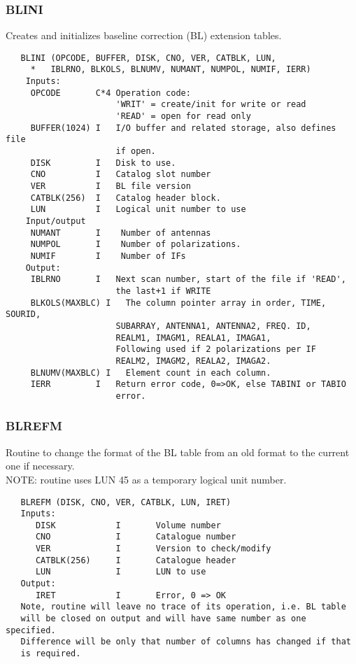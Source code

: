 \subsubsection{BLINI}
Creates and initializes baseline correction (BL) extension tables.
\begin{verbatim}
   BLINI (OPCODE, BUFFER, DISK, CNO, VER, CATBLK, LUN,
     *   IBLRNO, BLKOLS, BLNUMV, NUMANT, NUMPOL, NUMIF, IERR)
    Inputs:
     OPCODE       C*4 Operation code:
                      'WRIT' = create/init for write or read
                      'READ' = open for read only
     BUFFER(1024) I   I/O buffer and related storage, also defines file
                      if open.
     DISK         I   Disk to use.
     CNO          I   Catalog slot number
     VER          I   BL file version
     CATBLK(256)  I   Catalog header block.
     LUN          I   Logical unit number to use
    Input/output
     NUMANT       I    Number of antennas
     NUMPOL       I    Number of polarizations.
     NUMIF        I    Number of IFs
    Output:
     IBLRNO       I   Next scan number, start of the file if 'READ',
                      the last+1 if WRITE
     BLKOLS(MAXBLC) I   The column pointer array in order, TIME, SOURID,
                      SUBARRAY, ANTENNA1, ANTENNA2, FREQ. ID,
                      REALM1, IMAGM1, REALA1, IMAGA1,
                      Following used if 2 polarizations per IF
                      REALM2, IMAGM2, REALA2, IMAGA2.
     BLNUMV(MAXBLC) I   Element count in each column.
     IERR         I   Return error code, 0=>OK, else TABINI or TABIO
                      error.
\end{verbatim}

\subsubsection{BLREFM}
Routine to change the format of the BL table from an old format
to the current one if necessary.\\
NOTE: routine uses LUN 45 as a temporary logical unit number.
\begin{verbatim}
   BLREFM (DISK, CNO, VER, CATBLK, LUN, IRET)
   Inputs:
      DISK            I       Volume number
      CNO             I       Catalogue number
      VER             I       Version to check/modify
      CATBLK(256)     I       Catalogue header
      LUN             I       LUN to use
   Output:
      IRET            I       Error, 0 => OK
   Note, routine will leave no trace of its operation, i.e. BL table
   will be closed on output and will have same number as one specified.
   Difference will be only that number of columns has changed if that
   is required.
\end{verbatim}

